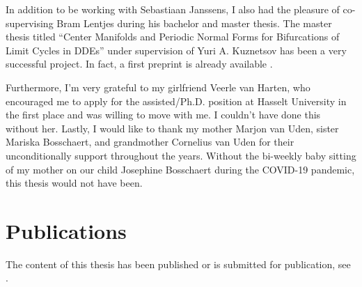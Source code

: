 In addition to be working with Sebastiaan Janssens, I also had the pleasure of
co-supervising Bram Lentjes during his bachelor and master thesis. The master thesis
titled ``Center Manifolds and Periodic Normal Forms for Bifurcations of Limit
Cycles in DDEs'' under supervision of Yuri A. Kuznetsov has been a very
successful project. In fact, a first preprint is already available
\cite{Bram@2022}.

Furthermore, I'm very grateful to my girlfriend Veerle van Harten, who encouraged
me to apply for the assisted/Ph.D. position at Hasselt University in the first
place and was willing to move with me. I couldn't have done this without her.
Lastly, I would like to thank my mother Marjon van Uden, sister Mariska
Bosschaert, and grandmother Cornelius van Uden for their unconditionally support
throughout the years. Without the bi-weekly baby sitting of my mother on our
child Josephine Bosschaert during the COVID-19 pandemic, this thesis would not
have been.


\section{Publications}
The content of this thesis has been published or is submitted for publication,
see \cite{Bosschaert@Interplay,Switching2019,PhysRevD.105.065021}.
